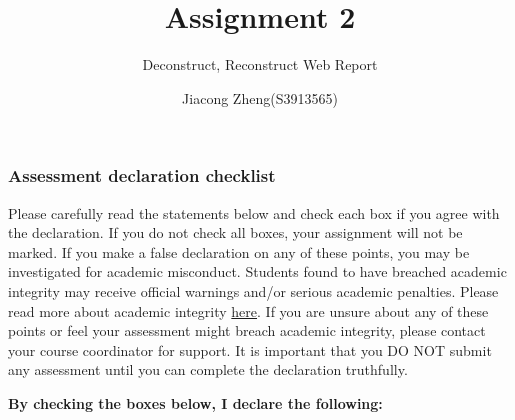 \documentclass[
]{article}
\title{Assignment 2}
\subtitle{Deconstruct, Reconstruct Web Report}
\author{Jiacong Zheng(S3913565)}
\date{}
\begin{document}
\maketitle

\subsubsection{Assessment declaration
checklist}\label{assessment-declaration-checklist}

Please carefully read the statements below and check each box if you
agree with the declaration. If you do not check all boxes, your
assignment will not be marked. If you make a false declaration on any of
these points, you may be investigated for academic misconduct. Students
found to have breached academic integrity may receive official warnings
and/or serious academic penalties. Please read more about academic
integrity
\href{https://www.rmit.edu.au/students/student-essentials/assessment-and-exams/academic-integrity}{here}.
If you are unsure about any of these points or feel your assessment
might breach academic integrity, please contact your course coordinator
for support. It is important that you DO NOT submit any assessment until
you can complete the declaration truthfully.

\textbf{By checking the boxes below, I declare the following:}
\end{document}
